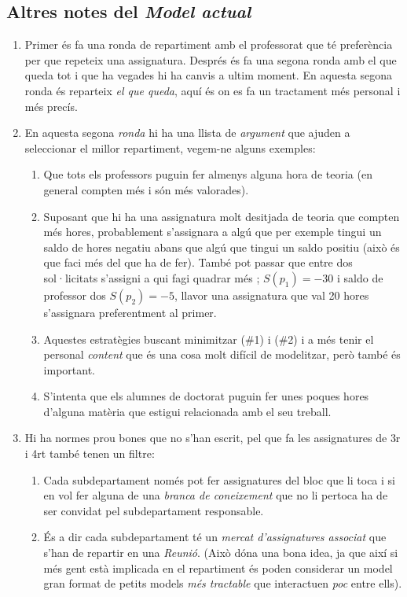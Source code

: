 \documentclass[10pt]{proc}
\begin{document}
	\subsection{Altres notes del \textit{Model actual}}
	\begin{enumerate}
		\item Primer és fa una ronda de repartiment amb el professorat que té preferència per que repeteix una assignatura. Després és fa una segona ronda amb el que queda tot i que ha vegades hi ha canvis a ultim moment. En aquesta segona ronda és reparteix \textit{el que queda}, aquí  és on es fa un tractament més personal i més precís.
		\item En aquesta segona \textit{ronda} hi ha una llista de \textit{argument} que ajuden a seleccionar el millor repartiment, vegem-ne alguns exemples:
		\begin{enumerate}
			\item Que tots els professors puguin fer almenys alguna hora de teoria (en general compten més i són més valorades).
			\item Suposant que hi ha una assignatura molt desitjada de teoria que compten més hores, probablement s'assignara a algú que per exemple tingui un saldo de hores negatiu abans que algú que tingui un saldo positiu (això és que faci més del que ha de fer). També pot passar que entre dos sol·licitats s'assigni a qui fagi quadrar més ; $S(p_1)=-30$ i saldo de professor dos $S(p_2)=-5$, llavor una assignatura que val 20 hores s'assignara preferentment al primer.
			\item Aquestes estratègies buscant minimitzar (\#1) i (\#2) i a més tenir el personal \textit{content} que és una cosa molt difícil de modelitzar, però també és important.
			\item S'intenta que els alumnes de doctorat puguin fer unes poques hores d'alguna matèria que estigui relacionada amb el seu treball.
		\end{enumerate} 
		\item Hi ha normes prou bones que no s'han escrit, pel que fa les assignatures de 3r i 4rt  també tenen un filtre:
		\begin{enumerate}
			\item  Cada subdepartament només pot fer assignatures del bloc que li toca i si en vol fer alguna de una \textit{branca de coneixement} que no li pertoca ha de ser convidat pel subdepartament responsable.
			\item És a dir cada subdepartament té un \textit{mercat d'assignatures associat} que s'han de repartir en una \textit{Reunió}. (Això dóna una bona idea, ja que així si més gent està implicada en el repartiment és poden considerar un model gran format de petits models \textit{més tractable} que interactuen \textit{poc} entre ells).
			\end{enumerate}
		\end{enumerate}
\end{document}
